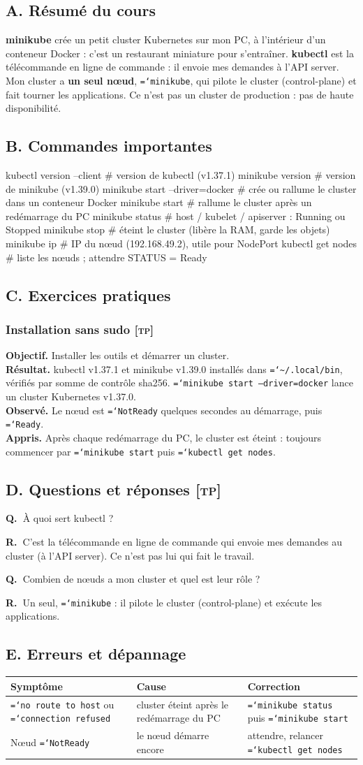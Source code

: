 \documentclass[11pt,a4paper]{article}
\newcommand{\cmd}[1]{\texttt{\hyphenchar\font=`\-#1}}
\newcommand{\tp}{\textsc{[tp]}}
\newcommand{\QR}[2]{\needspace{4\baselineskip}\par\noindent\textbf{Q.~}#1\par\nopagebreak\noindent\textbf{R.~}#2\par\medskip}
\newcommand{\partie}[1]{\needspace{9\baselineskip}\subsection*{#1}}
\newcommand{\exo}[1]{\needspace{8\baselineskip}\subsubsection*{#1}}
\begin{document}
\partie{A. Résumé du cours}
\textbf{minikube} crée un petit cluster Kubernetes sur mon PC, à l'intérieur d'un conteneur Docker : c'est un restaurant miniature pour s'entraîner.
\textbf{kubectl} est la télécommande en ligne de commande : il envoie mes demandes à l'API server.
Mon cluster a \textbf{un seul nœud}, \cmd{minikube}, qui pilote le cluster (control-plane) et fait tourner les applications. Ce n'est pas un cluster de production : pas de haute disponibilité.

\partie{B. Commandes importantes}
\begin{code}
kubectl version --client          # version de kubectl (v1.37.1)
minikube version                  # version de minikube (v1.39.0)
minikube start --driver=docker    # crée ou rallume le cluster dans un conteneur Docker
minikube start                    # rallume le cluster après un redémarrage du PC
minikube status                   # host / kubelet / apiserver : Running ou Stopped
minikube stop                     # éteint le cluster (libère la RAM, garde les objets)
minikube ip                       # IP du nœud (192.168.49.2), utile pour NodePort
kubectl get nodes                 # liste les nœuds ; attendre STATUS = Ready
\end{code}

\partie{C. Exercices pratiques}
\exo{Installation sans sudo \tp}
\textbf{Objectif.} Installer les outils et démarrer un cluster.\\
\textbf{Résultat.} kubectl v1.37.1 et minikube v1.39.0 installés dans \cmd{\textasciitilde/.local/bin}, vérifiés par somme de contrôle sha256. \cmd{minikube start --driver=docker} lance un cluster Kubernetes v1.37.0.\\
\textbf{Observé.} Le nœud est \cmd{NotReady} quelques secondes au démarrage, puis \cmd{Ready}.\\
\textbf{Appris.} Après chaque redémarrage du PC, le cluster est éteint : toujours commencer par \cmd{minikube start} puis \cmd{kubectl get nodes}.

\partie{D. Questions et réponses \tp}
\QR{À quoi sert kubectl ?}{C'est la télécommande en ligne de commande qui envoie mes demandes au cluster (à l'API server). Ce n'est pas lui qui fait le travail.}
\QR{Combien de nœuds a mon cluster et quel est leur rôle ?}{Un seul, \cmd{minikube} : il pilote le cluster (control-plane) et exécute les applications.}

\partie{E. Erreurs et dépannage}
\begin{center}
\begin{tabularx}{\linewidth}{@{}>{\raggedright\arraybackslash}p{4.2cm}>{\raggedright\arraybackslash}X>{\raggedright\arraybackslash}p{4.2cm}@{}}
\toprule
\textbf{Symptôme} & \textbf{Cause} & \textbf{Correction} \\
\midrule
\cmd{no route to host} ou \cmd{connection refused} & cluster éteint après le redémarrage du PC & \cmd{minikube status} puis \cmd{minikube start} \\
Nœud \cmd{NotReady} & le nœud démarre encore & attendre, relancer \cmd{kubectl get nodes} \\
\bottomrule
\end{tabularx}
\end{center}
\end{document}
